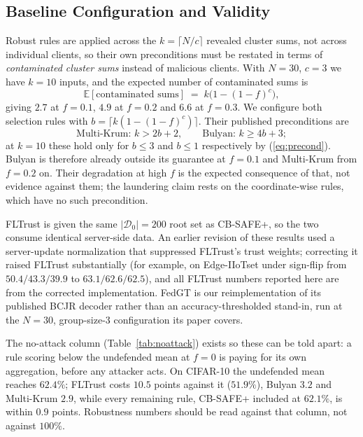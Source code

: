 \documentclass[lettersize,journal]{IEEEtran}
\begin{document}
\subsection{Baseline Configuration and Validity}\label{sec:baselines-config}
Robust rules are applied across the $k{=}\lceil N/c \rceil$ revealed cluster sums, not
across individual clients, so their own preconditions must be restated in terms of
\emph{contaminated cluster sums} instead of malicious clients. With $N{=}30$, $c{=}3$
we have $k{=}10$ inputs, and the expected number of contaminated sums is
\begin{equation}\label{eq:dirty}
\mathbb{E}[\text{contaminated sums}] \;=\; k\big(1-(1-f)^{c}\big),
\end{equation}
giving $2.7$ at $f{=}0.1$, $4.9$ at $f{=}0.2$ and $6.6$ at $f{=}0.3$. We configure
both selection rules with $b = \lceil k(1-(1-f)^c) \rceil$. Their published
preconditions are
\begin{equation}\label{eq:precond}
\text{Multi-Krum: } k > 2b+2, \qquad \text{Bulyan: } k \ge 4b+3 ;
\end{equation} at $k{=}10$ these hold only for $b{\le}3$
and $b{\le}1$ respectively by (\ref{eq:precond}). Bulyan is therefore already outside its guarantee at
$f{=}0.1$ and Multi-Krum from $f{=}0.2$ on. Their degradation at high $f$ is the
expected consequence of that, not evidence against them; the laundering claim rests
on the coordinate-wise rules, which have no such precondition.

FLTrust is given the same $|\mathcal{D}_0|{=}200$ root set as CB-SAFE+, so the two
consume identical server-side data. An earlier revision of these results used a
server-update normalization that suppressed FLTrust's trust weights; correcting it
raised FLTrust substantially (for example, on Edge-IIoTset under sign-flip from
$50.4/43.3/39.9$ to $63.1/62.6/62.5$), and all FLTrust numbers reported here are from
the corrected implementation. FedGT is our reimplementation of its published BCJR
decoder rather than an accuracy-thresholded stand-in, run at the $N{=}30$, group-size-3
configuration its paper covers.

The no-attack column (Table~\ref{tab:noattack}) exists so these can be told apart: a
rule scoring below the undefended mean at $f{=}0$ is paying for its own aggregation,
before any attacker acts. On CIFAR-10 the undefended mean reaches $62.4\%$; FLTrust
costs $10.5$ points against it ($51.9\%$), Bulyan $3.2$ and Multi-Krum $2.9$, while
every remaining rule, CB-SAFE+ included at $62.1\%$, is within $0.9$ points.
Robustness numbers should be read against that column, not against $100\%$.
\end{document}
